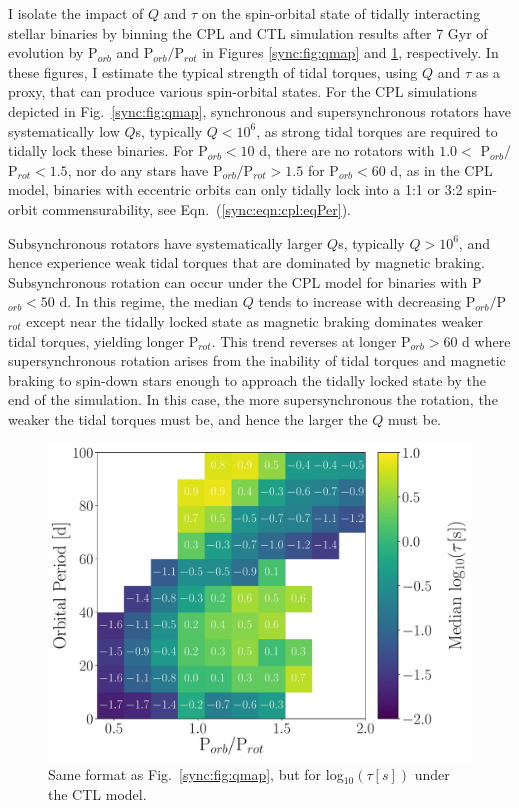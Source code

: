 I isolate the impact of $Q$ and $\tau$ on the spin-orbital state of tidally interacting stellar binaries by binning the CPL and CTL simulation results after 7 Gyr of evolution by P$_{orb}$ and P$_{orb}/$P$_{rot}$ in Figures \ref{sync:fig:qmap} and \ref{sync:fig:taumap}, respectively. In these figures, I estimate the typical strength of tidal torques, using $Q$ and $\tau$ as a proxy, that can produce various spin-orbital states. For the CPL simulations depicted in Fig.~\ref{sync:fig:qmap}, synchronous and supersynchronous rotators have systematically low $Q$s, typically $Q < 10^6$, as strong tidal torques are required to tidally lock these binaries. For P$_{orb} < 10$ d, there are no rotators with $1.0 <$ P$_{orb}/$P$_{rot} < 1.5$, nor do any stars have P$_{orb}/$P$_{rot} > 1.5$ for P$_{orb} < 60$ d, as in the CPL model, binaries with eccentric orbits can only tidally lock into a 1:1 or 3:2 spin-orbit commensurability, see Eqn.~(\ref{sync:eqn:cpl:eqPer}).   

Subsynchronous rotators have systematically larger $Q$s, typically $Q > 10^6$, and hence experience weak tidal torques that are dominated by magnetic braking.  Subsynchronous rotation can occur under the CPL model for binaries with P$_{orb} < 50$ d. In this regime, the median $Q$ tends to increase with decreasing P$_{orb}/$P$_{rot}$ except near the tidally locked state as magnetic braking dominates weaker tidal torques, yielding longer P$_{rot}$.  This trend reverses at longer P$_{orb} > 60$ d where supersynchronous rotation arises from the inability of tidal torques and magnetic braking to spin-down stars enough to approach the tidally locked state by the end of the simulation.  In this case, the more supersynchronous the rotation, the weaker the tidal torques must be, and hence the larger the $Q$ must be. 

\begin{figure}
	\includegraphics[width=\columnwidth]{porbProtPorbTauHist.pdf}
   \caption{Same format as Fig.~\ref{sync:fig:qmap}, but for log$_{10}(\tau [s])$ under the CTL model. }%
    \label{sync:fig:taumap}%
\end{figure}


